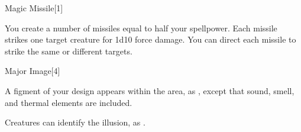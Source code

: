 \begin{spellsection}{Magic Missile}[1]
    \begin{spellheader}
    \end{spellheader}
    \begin{spellcontent}
        \begin{spelltargetinginfo}
        \end{spelltargetinginfo}
        \begin{spelleffects}
            \spelleffect You create a number of missiles equal to half your spellpower. Each missile strikes one target creature for 1d10 force damage. You can direct each missile to strike the same or different targets.
        \end{spelleffects}
    \end{spellcontent}
    \begin{spellfooter}
        \spellnotes \forcespellnotes
        \miscastrandom
    \end{spellfooter}
\end{spellsection}

\begin{spellsection}{Major Image}[4]
    \begin{spellheader}
    \end{spellheader}
    \begin{spellcontent}
        \begin{spelltargetinginfo}
        \end{spelltargetinginfo}
        \begin{spelleffects}
            \spelleffect A figment of your design appears within the area, as , except that sound, smell, and thermal elements are included.
            \spelldur \durshort
        \end{spelleffects}
    \end{spellcontent}
    \begin{spellfooter}
        \spellnotes Creatures can identify the illusion, as .
        \miscastexplode
    \end{spellfooter}
\end{spellsection}

